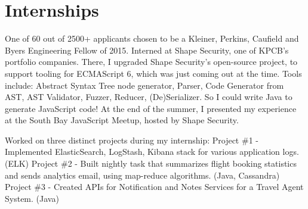 \documentclass[letterpaper]{deedy-resume-openfont} %
\begin{document}
\newpage %

\begin{minipage}[t]{0.29\textwidth} %

\section{}

\end{minipage} %
\hfill
\begin{minipage}[t]{0.7\textwidth} %


\section{Internships}

\vspace{\topsep} %

One of 60 out of 2500+ applicants chosen to be a Kleiner, Perkins, Caufield and Byers Engineering Fellow of 2015. Interned at Shape Security, one of KPCB's portfolio companies. There, I upgraded Shape Security's open-source project, to support tooling for ECMAScript 6, which was just coming out at the time. Tools include: Abstract Syntax Tree node generator, Parser, Code Generator from AST, AST Validator, Fuzzer, Reducer, (De)Serializer. So I could write Java to generate JavaScript code! At the end of the summer, I presented my experience at the South Bay JavaScript Meetup, hosted by Shape Security. 

\sectionsep %



Worked on three distinct projects during my internship:
Project \#1 - Implemented ElasticSearch, LogStash, Kibana stack for various application logs. (ELK)
Project \#2 - Built nightly task that summarizes flight booking statistics and sends analytics email, using map-reduce algorithms. (Java, Cassandra)
Project \#3 - Created APIs for Notification and Notes Services for a Travel Agent System. (Java)


\end{minipage}
\end{document}
